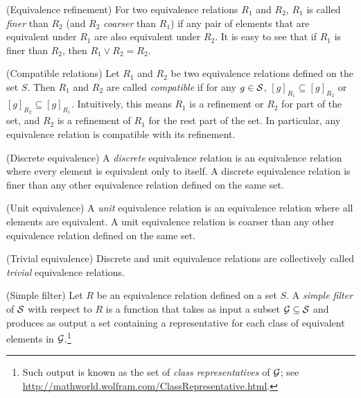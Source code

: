 \begin{definition}
(Equivalence refinement) For two equivalence relations $R_1$ and $R_2$, $R_1$ is called \emph{finer} than $R_2$ (and $R_2$ \emph{coarser} than $R_1$) if any pair of elements that are equivalent under $R_1$ are also equivalent under $R_2$. It is easy to see that if $R_1$ is finer than $R_2$, then $R_1 \vee R_2 = R_2$.
\end{definition}

\begin{definition}
(Compatible relations) Let $R_1$ and $R_2$ be two equivalence relations defined on the set $S$. Then $R_1$ and $R_2$ are called \emph{compatible} if for any $g \in \mathcal{S}$, $[g]_{R_1} \subseteq [g]_{R_2}$ or $[g]_{R_2} \subseteq [g]_{R_1}$. Intuitively, this means $R_1$ is a refinement or $R_2$ for part of the set, and $R_2$ is a refinement of $R_1$ for the rest part of the set. In particular, any equivalence relation is compatible with its refinement.
\end{definition}

\begin{definition}
(Discrete equivalence) A \emph{discrete} equivalence relation is an equivalence relation where every element is equivalent only to itself. A discrete equivalence relation is finer than any other equivalence relation defined on the same set.
\end{definition}

\begin{definition}
(Unit equivalence) A \emph{unit} equivalence relation is an equivalence relation where all elements are equivalent. A unit equivalence relation is coarser than any other equivalence relation defined on the same set.
\end{definition}

\begin{definition}
(Trivial equivalence) Discrete and unit equivalence relations are collectively called \emph{trivial} equivalence relations.
\end{definition}

\begin{definition}
(Simple filter) Let $R$ be an equivalence relation defined on a set $S$. A \emph{simple filter} of $\mathcal{S}$ with respect to $R$ is a function that takes as input a subset $\mathcal{G} \subseteq \mathcal{S}$ and produces as output a set containing a representative for each class of equivalent elements in $\mathcal{G}$.\footnote{Such output is known as the set of \emph{class representatives} of $\mathcal{G}$; see \url{http://mathworld.wolfram.com/ClassRepresentative.html}. }
\end{definition}

